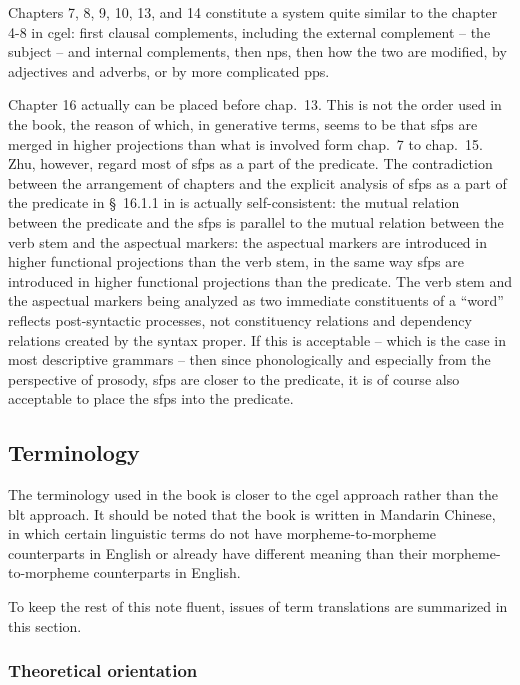 \documentclass[UTF8, a4paper, oneside, scheme=plain]{ctexart}
\newcommand*{\citesec}[1]{\S~{#1}}
\newcommand*{\citechap}[1]{chap.~{#1}}
\begin{document}
Chapters 7, 8, 9, 10, 13, and 14 constitute a system 
quite similar to the chapter 4-8 in \ac{cgel}:
first clausal complements, 
including the external complement -- the subject --
and internal complements,
then \ac{np}s,
then how the two are modified,
by adjectives and adverbs,
or by more complicated \acs{pp}s.

Chapter 16 actually can be placed before \citechap{13}.
This is not the order used in the book,
the reason of which, in generative terms,
seems to be that \ac{sfp}s are merged in higher projections than what is involved 
form \citechap{7} to \citechap{15}.
Zhu, however, regard most of \ac{sfp}s as a part of the predicate.
The contradiction between the arrangement of chapters 
and the explicit analysis of \ac{sfp}s as a part of the predicate in \citesec{16.1.1} 
in \citet{zhudexigrammar}
is actually self-consistent:
the mutual relation between the predicate and the \ac{sfp}s
is parallel to the mutual relation between the verb stem and the aspectual markers:
the aspectual markers are introduced in higher functional projections than the verb stem,
in the same way \ac{sfp}s are introduced in higher functional projections than the predicate.
The verb stem and the aspectual markers being analyzed as two immediate constituents of a ``word''
reflects post-syntactic processes,
not constituency relations and dependency relations created by the syntax proper.
If this is acceptable -- which is the case in most descriptive grammars --
then since phonologically and especially from the perspective of prosody,
\ac{sfp}s are closer to the predicate,
it is of course also acceptable to place the \ac{sfp}s into the predicate.

\subsection{Terminology}\label{sec:terminology}

The terminology used in the book is closer to the \ac{cgel} approach rather than the \ac{blt} approach.
It should be noted that the book is written in Mandarin Chinese,
in which certain linguistic terms 
do not have morpheme-to-morpheme counterparts in English or
already have different meaning than their morpheme-to-morpheme counterparts in English.

To keep the rest of this note fluent,
issues of term translations are summarized in this section.

\subsubsection{Theoretical orientation}
\end{document}
